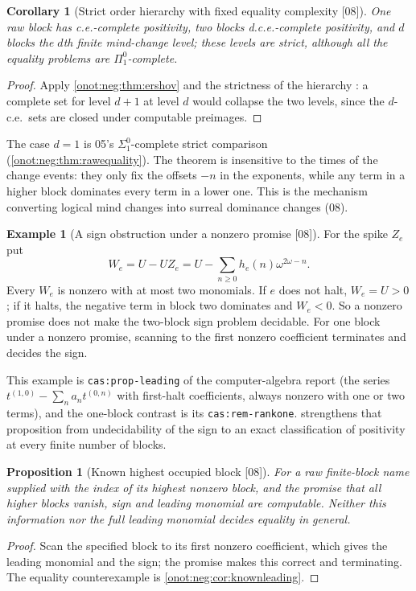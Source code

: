 \documentclass[11pt,oneside]{article}
\numberwithin{equation}{section}
\newtheorem{proposition}[proposition]{Proposition}
\newtheorem{corollary}[corollary]{Corollary}
\theoremstyle{definition}
\newtheorem{example}[example]{Example}
\theoremstyle{remark}
\newcommand{\src}[1]{\textup{\textsf{\small[#1]}}}
\newcommand{\replabel}[1]{\nolinkurl{#1}}
\begin{document}
\begin{corollary}[Strict order hierarchy with fixed equality complexity \src{08}]\label{onot:neg:cor:hierarchy}
One raw block has c.e.-complete positivity, two blocks d.c.e.-complete
positivity, and $d$ blocks the $d$th finite mind-change level; these levels are
strict, although all the equality problems are $\Pi^0_1$-complete.
\end{corollary}
\begin{proof}
Apply \cref{onot:neg:thm:ershov} and the strictness of the hierarchy
\cite{Ershov}: a complete set for level $d+1$ at level $d$ would collapse the two
levels, since the $d$-c.e.\ sets are closed under computable preimages.
\end{proof}
The case $d=1$ is 05's $\Sigma^0_1$-complete strict comparison
(\cref{onot:neg:thm:rawequality}). The theorem is insensitive to the times of the
change events: they only fix the offsets $-n$ in the exponents, while any term in a
higher block dominates every term in a lower one. This is the mechanism converting
logical mind changes into surreal dominance changes (08).

\begin{example}[A sign obstruction under a nonzero promise \src{08}]\label{onot:neg:ex:We}
For the spike $Z_e$ put
\[
 W_e=U-UZ_e=U-\sum_{n\ge0}h_e(n)\omega^{2\omega-n}.
\]
Every $W_e$ is nonzero with at most two monomials. If $e$ does not halt, $W_e=U>0$;
if it halts, the negative term in block two dominates and $W_e<0$. So a nonzero
promise does not make the two-block sign problem decidable. For one block under a
nonzero promise, scanning to the first nonzero coefficient terminates and decides
the sign.
\end{example}

This example is \replabel{cas:prop-leading} of the computer-algebra report (the
series $t^{(1,0)}-\sum_na_nt^{(0,n)}$ with first-halt coefficients, always nonzero
with one or two terms), and the one-block contrast is its
\replabel{cas:rem-rankone}.  strengthens that
proposition from undecidability of the sign to an exact classification of
positivity at every finite number of blocks.

\begin{proposition}[Known highest occupied block \src{08}]\label{onot:neg:prop:highestblock}
For a raw finite-block name supplied with the index of its highest nonzero block,
and the promise that all higher blocks vanish, sign and leading monomial are
computable. Neither this information nor the full leading monomial decides
equality in general.
\end{proposition}
\begin{proof}
Scan the specified block to its first nonzero coefficient, which gives the leading
monomial and the sign; the promise makes this correct and terminating. The
equality counterexample is \cref{onot:neg:cor:knownleading}.
\end{proof}
\end{document}
